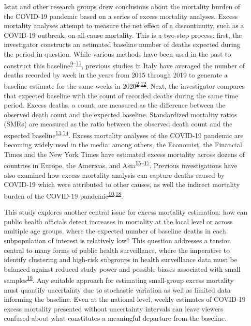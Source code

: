 \documentclass[
]{article}
\begin{document}
Istat and other research groups drew conclusions about the mortality burden of the COVID-19 pandemic based on a series of excess mortality analyses. Excess mortality analyses attempt to measure the net effect of a discontinuity, such as a COVID-19 outbreak, on all-cause mortality. This is a two-step process: first, the investigator constructs an estimated baseline number of deaths expected during the period in question. While various methods have been used in the past to construct this baseline\textsuperscript{\protect\hyperlink{ref-Serfling1963}{9}--\protect\hyperlink{ref-Noufaily2013}{11}}⁠, previous studies in Italy have averaged the number of deaths recorded by week in the years from 2015 through 2019 to generate a baseline estimate for the same weeks in 2020\textsuperscript{\protect\hyperlink{ref-Alicandro2020}{2},\protect\hyperlink{ref-Michelozzi2020}{12}}⁠. Next, the investigator compares that expected baseline with the count of recorded deaths during the same time period. Excess deaths, a count, are measured as the difference between the observed death count and the expected baseline. Standardized mortality ratios (SMRs) are measured as the ratio between the observed death count and the expected baseline\textsuperscript{\protect\hyperlink{ref-Dickman2004}{13},\protect\hyperlink{ref-Lambert2005}{14}}⁠. Excess mortality analyses of the COVID-19 pandemic are becoming widely used in the media: among others, the Economist, the Financial Times and the New York Times have estimated excess mortality across dozens of countries in Europe, the Americas, and Asia\textsuperscript{\protect\hyperlink{ref-Wu2020}{15}--\protect\hyperlink{ref-FTVisualux5cux26DataJournalismteam2020}{17}}⁠. Previous investigations have also examined how excess mortality analysis can capture deaths caused by COVID-19 which were attributed to other causes, as well the indirect mortality burden of the COVID-19 pandemic\textsuperscript{\protect\hyperlink{ref-Weinberger2020a}{10},\protect\hyperlink{ref-U.S.NationalCenterforHealthStatistics2021}{18}}.

This study explores another central issue for excess mortality estimation: how can public health officials detect increases in mortality at the local level or across multiple age groups, where the expected number of baseline deaths in each subpopulation of interest is relatively low? This question addresses a tension central to many forms of public health surveillance, where the imperative to identify clustering and high-risk subgroups in health surveillance data must be balanced against reduced study power and possible biases associated with small samples\textsuperscript{\protect\hyperlink{ref-Thacker1988}{19}}⁠. Any suitable approach for estimating small-group excess mortality must quantify uncertainty due to stochastic variation as well as limited data informing the baseline. Even at the national level, weekly estimates of COVID-19 excess mortality presented without uncertainty intervals can leave viewers confused about what constitutes a meaningful departure from the baseline.
\end{document}
